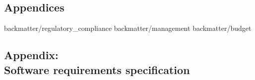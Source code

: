 \begin{appendices}
\setcounter{chapter}{9}
\setcounter{section}{0}

\chapter{Appendices}
	 {backmatter/regulatory_compliance}
	\newpage
	 {backmatter/management}
	\newpage
		 {backmatter/budget}

	\newpage
	\section{Appendix: \\Software requirements specification}
		\label{requirements}
		

	


\end{appendices}
